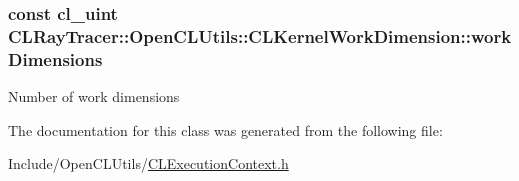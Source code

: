 \subsubsection[{\texorpdfstring{work\+Dimensions}{workDimensions}}]{\setlength{\rightskip}{0pt plus 5cm}const cl\+\_\+uint C\+L\+Ray\+Tracer\+::\+Open\+C\+L\+Utils\+::\+C\+L\+Kernel\+Work\+Dimension\+::work\+Dimensions}\hypertarget{class_c_l_ray_tracer_1_1_open_c_l_utils_1_1_c_l_kernel_work_dimension_affd23924899b196276bedd7010af3e30}{}\label{class_c_l_ray_tracer_1_1_open_c_l_utils_1_1_c_l_kernel_work_dimension_affd23924899b196276bedd7010af3e30}
Number of work dimensions 

The documentation for this class was generated from the following file\+:\begin{DoxyCompactItemize}
\item 
Include/\+Open\+C\+L\+Utils/\hyperlink{_c_l_execution_context_8h}{C\+L\+Execution\+Context.\+h}\end{DoxyCompactItemize}
